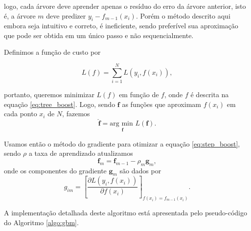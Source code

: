 logo, cada árvore deve aprender apenas o resíduo do erro da árvore anterior, isto é, a árvore $m$ deve predizer $y_i - f_{m-1}(x_i)$. Porém o método descrito aqui embora seja intuitivo e correto, é ineficiente, sendo preferível sua aproximação que pode ser obtida em um único passo e não sequencialmente.

Definimos a função de custo por

\begin{equation}
    L(f) = \sum_{i=1}^N L(y_i,f(x_i)),
\end{equation}

portanto, queremos minimizar $L(f)$ em função de $f$, onde $f$ é descrita na equação \ref{eq:tree_boost}. Logo, sendo $\boldsymbol{f}$ as funções que aproximam $f(x_i)$ em cada ponto $x_i$ de $N$, fazemos
\begin{equation}
\label{eq:step_boost}
\hat{\boldsymbol{f}} = \underset{\boldsymbol{f}}{\text{arg min }}L(\boldsymbol{f}).
\end{equation}

Usamos então o método do gradiente para otimizar a equação \ref{eq:step_boost}, sendo $\rho$ a taxa de aprendizado atualizamos
\begin{equation}
    \boldsymbol{f}_m = \boldsymbol{f}_{m-1} - \rho_m \boldsymbol{g}_m,
\end{equation}
onde os componentes do gradiente $\boldsymbol{g}_m$ são dados por
\begin{equation}
    g_{im} = \left[ \frac{\partial L(y_i,f(x_i))}{\partial
                f(x_i)} \right]_{f(x_i)=f_{m-1}(x_i)}.
\end{equation}

A implementação detalhada deste algoritmo está apresentada pelo pseudo-código do Algoritmo \ref{algo:gbm}.

